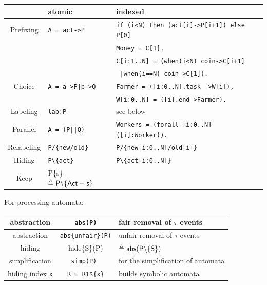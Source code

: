 \documentclass[]{article}
\begin{document}
\vspace{2ex}\begin{tabular}{|c|l|l|} \hline
& atomic & indexed \\ \hline
Prefixing & \verb$A = act->P$ &  \verb$if (i<N) then (act[i]->P[i+1]) else P[0]$ \\ \hline
  & &  \verb$Money = C[1], $ \\
  & & \verb$C[i:1..N] = (when(i<N) coin->C[i+1]$ \\
       &   & \hspace{1.7cm} \verb$ |when(i==N) coin->C[1]).$ \\ \hline
Choice  &  \verb$A = a->P|b->Q$  &\verb$Farmer = ([i:0..N].task ->W[i]),$ \\
    &   &\hspace{0.7cm}\verb$W[i:0..N] = ([i].end->Farmer).$ \\ \hline
Labeling & \verb$lab:P$ &  see below \\ \hline
Parallel &  \verb$A = (P||Q)$ & \verb$Workers = (forall [i:0..N] ([i]:Worker)).$ \\ \hline
Relabeling & \verb$P/{new/old}$ &  \verb$P/{new[i:0..N]/old[i]}$ \\ \hline
Hiding & \verb$P\{act}$ & \verb$P\{act[i:0..N]}$ \\ \hline %
Keep  & {\sf P\{s\}}  $\sf \triangleq  P\backslash \{Act- s\}$ & \\ \hline
\end{tabular}

\vspace{2ex}\noindent For processing automata:

\vspace{2ex}
\begin{tabular}{|c|c|l|}
\hline abstraction  & {\tt abs(P)} & fair removal of $\tau$ events \\
\hline abstraction  & {\tt abs\{unfair\}(P)} & unfair  removal of $\tau$ events \\ 
\hline hiding  & {\sf hide\{S\}(P)} & $\sf \triangleq  abs(P\backslash \{S\})$ \\ \hline
simplification  & {\tt simp(P) } & for the simplification of automata \\ \hline
hiding index \verb|x| &\verb|R = R1${x}|&  builds symbolic automata \\ \hline
\end{tabular}
\end{document}
